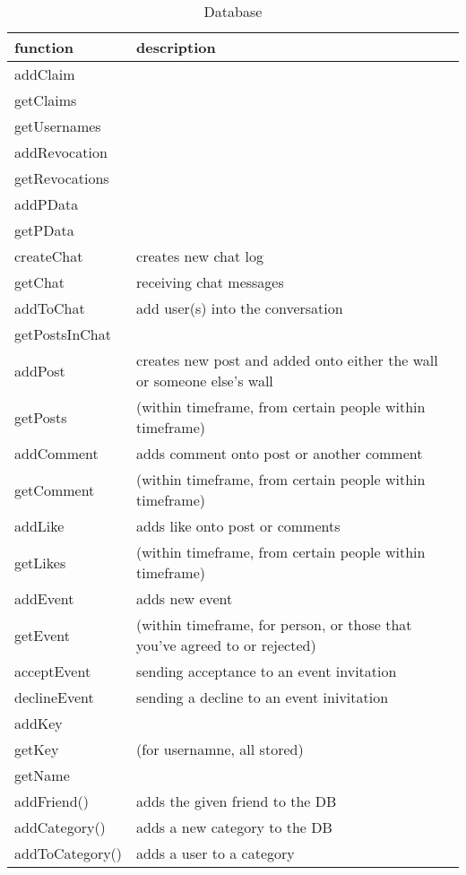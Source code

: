\begin{table}[h]
    \centering
    \begin{tabular}{p{5cm}p{9cm}}
    function                 & description\\ \hline
    
    addClaim        & \\
    getClaims       & \\
    getUsernames    & \\
    
    addRevocation   & \\
    getRevocations  & \\
    
    addPData        & \\
    getPData        & \\
    
    createChat      & creates new chat log\\
    getChat         & receiving chat messages\\
    addToChat       & add user(s) into the conversation\\
    getPostsInChat  & \\
    
    addPost         & creates new post and added onto either the wall or someone else's wall\\
    getPosts        & (within timeframe, from certain people within timeframe)\\
    
    addComment      & adds comment onto post or another comment\\
    getComment      & (within timeframe, from certain people within timeframe)\\
    
    addLike         & adds like onto post or comments\\
    getLikes        & (within timeframe, from certain people within timeframe)\\
    
    addEvent        & adds new event\\
    getEvent        & (within timeframe, for person, or those that you've agreed to or rejected)\\
    acceptEvent     & sending acceptance to an event invitation\\
    declineEvent    & sending a decline to an event inivitation\\
    
    addKey          & \\
    getKey          & (for usernamne, all stored)\\
    getName         & \\

    addFriend()     & adds the given friend to the DB\\
    addCategory()   & adds a new category to the DB\\
    addToCategory() & adds a user to a category\\
    \end{tabular}
    \caption{Database}
\end{table}

